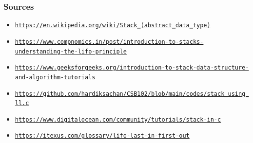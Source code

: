 \documentclass[10pt]{beamer}
\begin{document}
\begin{frame}\frametitle{Sources}
    \begin{itemize}
        \item \texttt{\url{https://en.wikipedia.org/wiki/Stack_(abstract_data_type)}}
        \item \texttt{\url{https://www.compnomics.in/post/introduction-to-stacks-understanding-the-lifo-principle}}
        \item \texttt{\url{https://www.geeksforgeeks.org/introduction-to-stack-data-structure-and-algorithm-tutorials}}
        \item \texttt{\url{https://github.com/hardiksachan/CSB102/blob/main/codes/stack_using_ll.c}}
        \item \texttt{\url{https://www.digitalocean.com/community/tutorials/stack-in-c}}
        \item \texttt{\url{https://itexus.com/glossary/lifo-last-in-first-out}}
    \end{itemize}
\end{frame}

\end{document}
